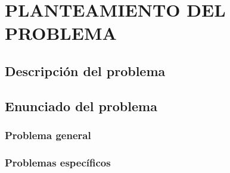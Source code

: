 \pagestyle{fancy}
\chapter{PLANTEAMIENTO DEL PROBLEMA}
\section{Descripción del problema}
\lipsum[4-5]
\lipsum[4-5]
\lipsum[4-8]
\section{Enunciado del problema}
\subsection{Problema general}
\subsection{Problemas específicos}
